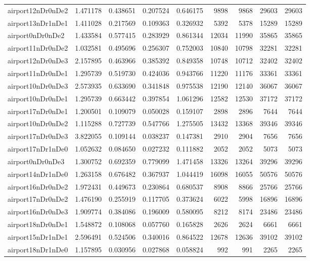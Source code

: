 \begin{longtable}{|l|r|r|r|r|r|r|r|r|}
airport12nDr0nDe2 & 1.471178 & 0.438651 & 0.207524 & 0.646175 & 9898 & 9868 & 29603 & 29603 \\
airport13nDr1nDe1 & 1.411028 & 0.217569 & 0.109363 & 0.326932 & 5392 & 5378 & 15289 & 15289 \\
airport0nDr0nDe2 & 1.433584 & 0.577415 & 0.283929 & 0.861344 & 12034 & 11990 & 35865 & 35865 \\
airport11nDr0nDe2 & 1.032581 & 0.495696 & 0.256307 & 0.752003 & 10840 & 10798 & 32281 & 32281 \\
airport12nDr0nDe3 & 2.157895 & 0.463966 & 0.385392 & 0.849358 & 10748 & 10712 & 32402 & 32402 \\
airport11nDr0nDe1 & 1.295739 & 0.519730 & 0.424036 & 0.943766 & 11220 & 11176 & 33361 & 33361 \\
airport10nDr0nDe3 & 2.573935 & 0.633690 & 0.341848 & 0.975538 & 12190 & 12140 & 36067 & 36067 \\
airport10nDr0nDe1 & 1.295739 & 0.663442 & 0.397854 & 1.061296 & 12582 & 12530 & 37172 & 37172 \\
airport17nDr0nDe1 & 1.200501 & 0.109079 & 0.050028 & 0.159107 & 2898 & 2896 & 7644 & 7644 \\
airport10nDr0nDe2 & 1.115288 & 0.727739 & 0.547766 & 1.275505 & 13432 & 13368 & 39346 & 39346 \\
airport17nDr0nDe3 & 3.822055 & 0.109144 & 0.038237 & 0.147381 & 2910 & 2904 & 7656 & 7656 \\
airport17nDr1nDe0 & 1.052632 & 0.084650 & 0.027232 & 0.111882 & 2052 & 2052 & 5073 & 5073 \\
airport0nDr0nDe3 & 1.300752 & 0.692359 & 0.779099 & 1.471458 & 13326 & 13264 & 39296 & 39296 \\
airport14nDr1nDe0 & 1.263158 & 0.676482 & 0.367937 & 1.044419 & 16098 & 16055 & 50576 & 50576 \\
airport16nDr0nDe2 & 1.972431 & 0.449673 & 0.230864 & 0.680537 & 8908 & 8866 & 25766 & 25766 \\
airport17nDr0nDe2 & 1.476190 & 0.255919 & 0.117705 & 0.373624 & 6022 & 5998 & 16896 & 16896 \\
airport16nDr0nDe3 & 1.909774 & 0.384086 & 0.196009 & 0.580095 & 8212 & 8174 & 23486 & 23486 \\
airport18nDr0nDe1 & 1.548872 & 0.108068 & 0.057760 & 0.165828 & 2626 & 2624 & 6661 & 6661 \\
airport15nDr1nDe1 & 2.596491 & 0.524506 & 0.340016 & 0.864522 & 12678 & 12636 & 39102 & 39102 \\
airport18nDr1nDe0 & 1.157895 & 0.030956 & 0.027868 & 0.058824 & 992 & 991 & 2265 & 2265 \\

\end{longtable}
